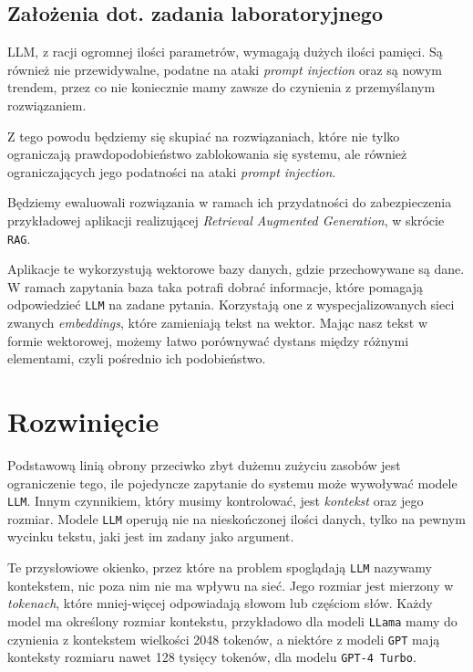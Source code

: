 \documentclass[12pt,a4paper]{article}
\begin{document}
\subsection{Założenia dot. zadania laboratoryjnego}

LLM, z racji ogromnej ilości parametrów, wymagają dużych ilości pamięci. Są
również nie przewidywalne, podatne na ataki \emph{prompt injection}\cite{greshake2023youve} oraz są
nowym trendem, przez co nie koniecznie mamy zawsze do czynienia z przemyślanym
rozwiązaniem.

Z tego powodu będziemy się skupiać na rozwiązaniach, które nie tylko ograniczają
prawdopodobieństwo zablokowania się systemu, ale również ograniczających jego
podatności na ataki \emph{prompt injection}.

Będziemy ewaluowali rozwiązania w ramach ich przydatności do zabezpieczenia 
przykładowej aplikacji realizującej \emph{Retrieval Augmented Generation}, w
skrócie \texttt{RAG}. 

Aplikacje te wykorzystują wektorowe bazy danych, gdzie przechowywane są dane. W
ramach zapytania baza taka potrafi dobrać informacje, które pomagają
odpowiedzieć \texttt{LLM} na zadane pytania. Korzystają one z wyspecjalizowanych
sieci zwanych \emph{embeddings}, które zamieniają tekst na wektor. Mając nasz
tekst w formie wektorowej, możemy łatwo porównywać dystans między różnymi
elementami, czyli pośrednio ich podobieństwo.

\newpage

\section{Rozwinięcie}

Podstawową linią obrony przeciwko zbyt dużemu zużyciu zasobów jest ograniczenie
tego, ile pojedyncze zapytanie do systemu może wywoływać modele \texttt{LLM}.
Innym czynnikiem, który musimy kontrolować, jest \emph{kontekst} oraz jego
rozmiar. Modele \texttt{LLM} operują nie na nieskończonej ilości danych, tylko
na pewnym wycinku tekstu, jaki jest im zadany jako argument.

Te przysłowiowe okienko, przez które na problem spoglądają \texttt{LLM} nazywamy 
kontekstem, nic poza nim nie ma wpływu na sieć. Jego rozmiar jest mierzony w
\emph{tokenach}, które mniej-więcej odpowiadają słowom lub częściom słów. Każdy
model ma określony rozmiar kontekstu, przykładowo dla modeli \texttt{LLama} mamy
do czynienia z kontekstem wielkości 2048 tokenów\cite{touvron2023llama}, a niektóre z modeli
\texttt{GPT} mają konteksty rozmiaru nawet 128 tysięcy tokenów, dla modelu
\texttt{GPT-4 Turbo}.
\end{document}

